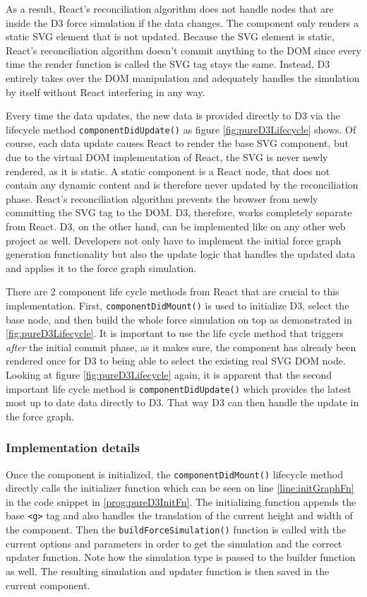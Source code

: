 As a result, React's reconciliation algorithm does not handle nodes that are inside the D3 force simulation if the data changes. The component only renders a static SVG element that is not updated. Because the SVG element is static, React's reconciliation algorithm doesn't commit anything to the DOM since every time the render function is called the SVG tag stays the same. Instead, D3 entirely takes over the DOM manipulation and adequately handles the simulation by itself without React interfering in any way.

Every time the data updates, the new data is provided directly to D3 via the lifecycle method \texttt{componentDidUpdate()} as figure \ref{fig:pureD3Lifecycle} shows. Of course, each data update causes React to render the base SVG component, but due to the virtual DOM implementation of React, the SVG is never newly rendered, as it is static. A static component is a React node, that does not contain any dynamic content and is therefore never updated by the reconciliation phase. React's reconciliation algorithm prevents the browser from newly committing the SVG tag to the DOM. D3, therefore, works completely separate from React. D3, on the other hand, can be implemented like on any other web project as well. Developers not only have to implement the initial force graph generation functionality but also the update logic that handles the updated data and applies it to the force graph simulation.

There are 2 component life cycle methods from React that are crucial to this implementation. First, \texttt{componentDidMount()} is used to initialize D3, select the base node, and then build the whole force simulation on top as demonstrated in \ref{fig:pureD3Lifecycle}. It is important to use the life cycle method that triggers \emph{after} the initial commit phase, as it makes sure, the component has already been rendered once for D3 to being able to select the existing real SVG DOM node. Looking at figure \ref{fig:pureD3Lifecycle} again, it is apparent that the second important life cycle method is \texttt{componentDidUpdate()} which provides the latest most up to date data directly to D3. That way D3 can then handle the update in the force graph.

\subsubsection{Implementation details}

Once the component is initialized, the \texttt{componentDidMount()} lifecycle method directly calls the initializer function which can be seen on line \ref{line:initGraphFn} in the code snippet in \ref{prog:pureD3InitFn}. The initializing function appends the base \texttt{<g>} tag and also handles the translation of the current height and width of the component. Then the \texttt{buildForceSimulation()} function is called with the current options and parameters in order to get the simulation and the correct updater function. Note how the simulation type is passed to the builder function as well. The resulting simulation and updater function is then saved in the current component.

